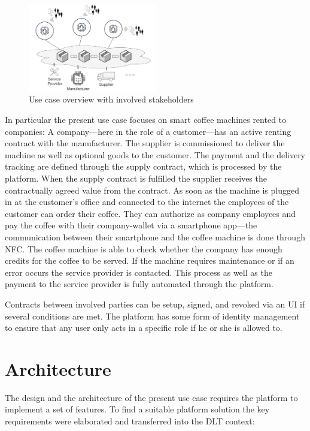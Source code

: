 \documentclass[conference]{IEEEtran}
\begin{document}
\begin{figure}[hbt]
\centering
\includegraphics[width=0.5\textwidth]{overview.png}
\caption{Use case overview with involved stakeholders}
\label{fig:overview}
\end{figure}

In particular the present use case focuses on smart coffee machines rented to companies: A company---here in the role of a customer---has an active renting contract with the manufacturer. The supplier is commissioned to deliver the machine as well as optional goods to the customer. The payment and the delivery tracking are defined through the supply contract, which is processed by the platform. When the supply contract is fulfilled the supplier receives the contractually agreed value from the contract. As soon as the machine is plugged in at the customer's office and connected to the internet the employees of the customer can order their coffee. They can authorize as company employees and pay the coffee with their company-wallet via a smartphone app---the communication between their smartphone and the coffee machine is done through NFC. The coffee machine is able to check whether the company has enough credits for the coffee to be served. If the machine requires maintenance or if an error occurs the service provider is contacted. This process as well as the payment to the service provider is fully automated through the platform.

Contracts between involved parties can be setup, signed, and revoked via an UI if several conditions are met. The platform has some form of identity management to ensure that any user only acts in a specific role if he or she is allowed to. 

%
\section{Architecture}

The design and the architecture of the present use case requires the platform to implement a set of features. To find a suitable platform solution the key requirements were elaborated and transferred into the DLT context:
\end{document}

